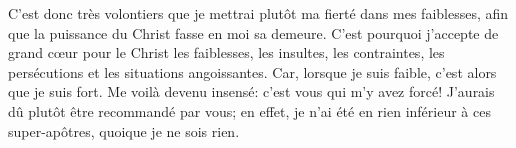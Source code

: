 C’est donc très volontiers que je mettrai plutôt ma fierté dans mes faiblesses,
	afin que la puissance du Christ fasse en moi sa demeure.
C’est pourquoi j’accepte de grand cœur pour le Christ
	les faiblesses, les insultes, les contraintes,
	les persécutions et les situations angoissantes.
Car, lorsque je suis faible, c’est alors que je suis fort.
Me voilà devenu insensé: c’est vous qui m’y avez forcé!
	J’aurais dû plutôt être recommandé par vous;
	en effet, je n’ai été en rien inférieur à ces super-apôtres,
	quoique je ne sois rien.
